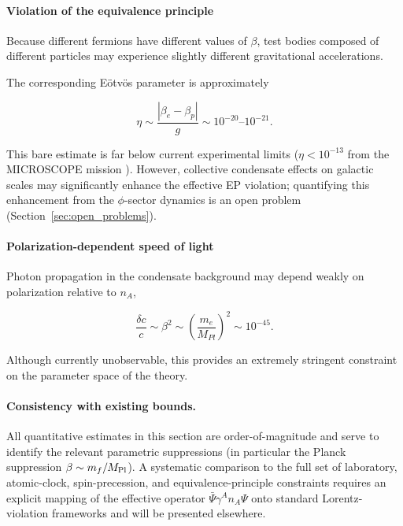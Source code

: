 \documentclass[11pt,a4paper]{article}
\numberwithin{equation}{section}
\begin{document}
\paragraph{Violation of the equivalence principle}

Because different fermions have different values of $\beta$,
test bodies composed of different particles may experience slightly
different gravitational accelerations.

The corresponding Eötvös parameter is approximately

\begin{equation}
\eta
\sim
\frac{|\beta_e-\beta_p|}{g}
\sim 10^{-20}\text{--}10^{-21}.
\end{equation}

This bare estimate is far below current experimental limits
($\eta < 10^{-13}$ from the MICROSCOPE mission \cite{MICROSCOPE2022}).
However, collective condensate effects on galactic scales may 
significantly enhance the effective EP violation; quantifying 
this enhancement from the $\phi$-sector dynamics is an open 
problem (Section~\ref{sec:open_problems}).

\paragraph{Polarization-dependent speed of light}

Photon propagation in the condensate background may depend weakly on
polarization relative to $n_A$,

\begin{equation}
\frac{\delta c}{c}
\sim
\beta^2
\sim
\left(\frac{m_e}{M_{Pl}}\right)^2
\sim
10^{-45}.
\end{equation}

Although currently unobservable, this provides an extremely stringent
constraint on the parameter space of the theory.



\paragraph{Consistency with existing bounds.}
All quantitative estimates in this section are order-of-magnitude and
serve to identify the relevant parametric suppressions (in particular the
Planck suppression $\beta\sim m_f/M_{\rm Pl}$). A systematic comparison to
the full set of laboratory, atomic-clock, spin-precession, and
equivalence-principle constraints requires an explicit mapping of the
effective operator $\bar{\Psi}\gamma^A n_A\Psi$ onto standard
Lorentz-violation frameworks and will be presented elsewhere.
\end{document}
